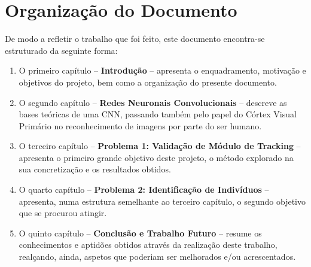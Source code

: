 \section{Organização do Documento}
\label{sec:organ}
De modo a refletir o trabalho que foi feito, este documento encontra-se estruturado da seguinte forma:
\begin{enumerate}
\item O primeiro capítulo -- \textbf{Introdução} -- apresenta o enquadramento, motivação e objetivos do projeto, bem como a organização do presente documento.
\item O segundo capítulo -- \textbf{Redes Neuronais Convolucionais} -- descreve as bases teóricas de uma \ac{CNN}, passando também pelo papel do Córtex Visual Primário no reconhecimento de imagens por parte do ser humano.
\item O terceiro capítulo -- \textbf{Problema 1: Validação de Módulo de Tracking} -- apresenta o primeiro grande objetivo deste projeto, o método explorado na sua concretização e os resultados obtidos.
\item O quarto capítulo -- \textbf{Problema 2: Identificação de Indivíduos} -- apresenta, numa estrutura semelhante ao terceiro capítulo, o segundo objetivo que se procurou atingir.
\item O quinto capítulo -- \textbf{Conclusão e Trabalho Futuro} -- resume os conhecimentos e aptidões obtidos através da realização deste trabalho, realçando, ainda, aspetos que poderiam ser melhorados e/ou acrescentados.
\end{enumerate}